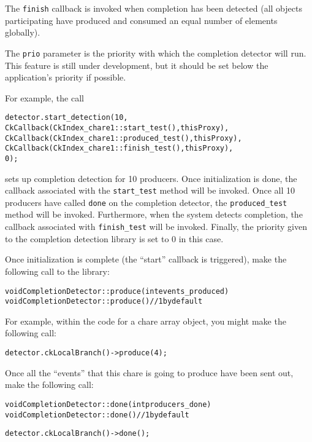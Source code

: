 The \verb|finish| callback is invoked when completion has been
detected (all objects participating have produced and consumed an
equal number of elements globally).

The \verb|prio| parameter is the priority with which the completion detector will run. 
This feature is still under development, but it should be set below the
application's priority if possible.

For example, the call

\begin{alltt}
detector.start_detection(10,
                         CkCallback(CkIndex_chare1::start_test(), thisProxy),
                         CkCallback(CkIndex_chare1::produced_test(), thisProxy),
                         CkCallback(CkIndex_chare1::finish_test(), thisProxy),
                         0);
\end{alltt}

sets up completion detection for 10 producers. Once initialization is done, the callback 
associated with the {\tt start\_test} method will be invoked. Once all 10 producers have
called \verb|done| on the completion detector, the {\tt produced\_test} method
will be invoked. Furthermore, when the system detects completion, the callback associated
with {\tt finish\_test} will be invoked. Finally, the priority given to the completion
detection library is set to 0 in this case.

Once initialization is complete (the ``start'' callback is triggered),
make the following call to the library:

\begin{alltt}
void CompletionDetector::produce(int events_produced)
void CompletionDetector::produce() // 1 by default
\end{alltt}

For example, within the code for a chare array object, you might make the following call:
\begin{alltt}
detector.ckLocalBranch()->produce(4);
\end{alltt}

Once all the ``events'' that this chare is going to produce have been sent out,
make the following call:

\begin{alltt}
void CompletionDetector::done(int producers_done)
void CompletionDetector::done() // 1 by default
\end{alltt}

\begin{alltt}
detector.ckLocalBranch()->done();
\end{alltt}


